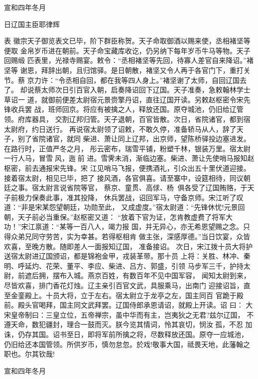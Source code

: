 宣和四年冬月

日辽国主臣耶律辉

表
徽宗天子御览表文已毕，阶下群臣称贺。天子命取御酒以赐来使，丞相褚坚等便取
金帛岁币进在朝前。天子命宝藏库收讫，仍另纳下每年岁币牛马等物。天子回赐缎
匹表里，光禄寺赐宴。敕令：“丞相褚坚等先回，待寡人差官自来降诏。”褚坚等
谢恩，拜辞出朝，且归馆驿。是日朝散，褚坚又令人再于各官门下，重打关节。蔡
京力许：“令丞相自回，都在我等四人身上。”褚坚谢了太师，自回辽国去了。
却说蔡太师次日引百官入朝，启奏降诏回下辽国。天子准奏，急敕翰林学士草诏一
道，就御前便差太尉宿元景赍擎丹诏，直往辽国开读。另敕赵枢密令宋先锋收兵罢
战，班师回京。将应有被擒之人，释放还国。原夺城池，仍旧给辽管领。府库器具，
交割辽邦归管。天子退朝，百官皆散。次日，省院诸官，都到宿太尉府，约日送行。
再说宿太尉领了诏敕，不敢久停，准备轿马从人，辞了天子，别了省院诸官，就同
柴进、萧让同上辽邦，出京师，望陈桥驿投边塞进发。在路行时，正值严冬之月，
彤云密布，瑞雪平铺，粉塑千林，银装万里。宿太尉一行人马，冒雪风，迤前
进。雪霁未消，渐临边塞。柴进、萧让先使哨马报知赵枢密，前去通报宋先锋。宋
江见哨马飞报，便携酒礼，引众出五十里伏道迎接。接着宿太尉，相见已毕，把了
接风酒，各官俱喜。请至寨中，设筵相待，同议朝廷之事。宿太尉言说省院等官，
蔡京、童贯、高俅、杨，俱各受了辽国贿赂，于天子前极力保奏此事，准其投降，
休兵罢战，诏回军马，守备京师。宋江听了叹道：“非是宋某怨望朝廷，功勋至此，
又成虚度。”宿太尉道：“先锋休忧!元景回朝，天子前必当重保。”赵枢密又道：
“放着下官为证，怎肯教虚费了将军大功！”宋江禀道：“某等一百八人，竭力报
国，并无异心，亦无希恩望赐之念。只得众弟兄同守劳苦，实为幸甚。若得枢相肯
做主张，深感厚德。”当日饮宴，众皆欢喜，至晚方散。随即差人一面报知辽国，
准备接诏。
次日，宋江拨十员大将护送宿太尉进辽国颁诏，都是锦袍金甲，戎装革带。那十员
上将：关胜、林冲、秦明、呼延灼、花荣、董平、李应、柴进、吕方、郭盛，引领
马步军三千，护持太尉，前遮后拥，摆布入城。燕京百姓，有数百年不见中国军容，
闻知太尉到来，尽皆欢喜，排门香花灯烛。辽主亲引百官文武，具服乘马，出南门
迎接诏旨，直至金銮殿上。十员大将，立于左右。宿太尉立于龙亭之左，国主同百
官跪于殿前。殿头官喝拜，国主同文武拜罢。辽国侍郎承恩请诏，就殿上开读。诏
曰：
大宋皇帝制曰：三皇立位，五帝禅宗，虽中华而有主，岂夷狄之无君?兹尔辽国，
不遵天命，数犯疆封，理合一鼓而灭。朕今览其情词，怜其哀切，悯汝孤，不忍
加诛，仍存其国。诏书至日，即将军前所擒之将，尽数释放还国。原夺一应城池，
仍旧给还本国管领。所供岁币，慎勿怠忽。於戏!敬事大国，祗畏天地，此藩翰之
职也。尔其钦哉!

宣和四年冬月

